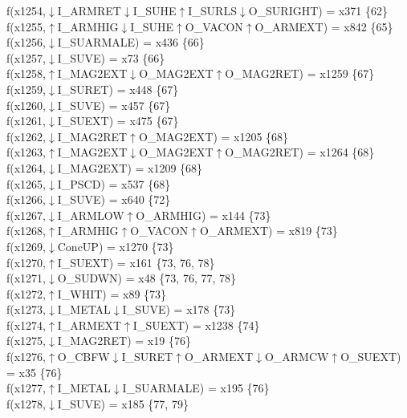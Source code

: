 f(x1254,$\downarrow$I\_ARMRET$\downarrow$I\_SUHE$\uparrow$I\_SURLS$\downarrow$O\_SURIGHT) = x371 \{62\} \\  
f(x1255,$\uparrow$I\_ARMHIG$\downarrow$I\_SUHE$\uparrow$O\_VACON$\uparrow$O\_ARMEXT) = x842 \{65\} \\  
f(x1256,$\downarrow$I\_SUARMALE) = x436 \{66\} \\  
f(x1257,$\downarrow$I\_SUVE) = x73 \{66\} \\  
f(x1258,$\uparrow$I\_MAG2EXT$\downarrow$O\_MAG2EXT$\uparrow$O\_MAG2RET) = x1259 \{67\} \\  
f(x1259,$\downarrow$I\_SURET) = x448 \{67\} \\  
f(x1260,$\downarrow$I\_SUVE) = x457 \{67\} \\  
f(x1261,$\downarrow$I\_SUEXT) = x475 \{67\} \\  
f(x1262,$\downarrow$I\_MAG2RET$\uparrow$O\_MAG2EXT) = x1205 \{68\} \\  
f(x1263,$\uparrow$I\_MAG2EXT$\downarrow$O\_MAG2EXT$\uparrow$O\_MAG2RET) = x1264 \{68\} \\  
f(x1264,$\downarrow$I\_MAG2EXT) = x1209 \{68\} \\  
f(x1265,$\downarrow$I\_PSCD) = x537 \{68\} \\  
f(x1266,$\downarrow$I\_SUVE) = x640 \{72\} \\  
f(x1267,$\downarrow$I\_ARMLOW$\uparrow$O\_ARMHIG) = x144 \{73\} \\  
f(x1268,$\uparrow$I\_ARMHIG$\uparrow$O\_VACON$\uparrow$O\_ARMEXT) = x819 \{73\} \\  
f(x1269,$\downarrow$ConcUP) = x1270 \{73\} \\  
f(x1270,$\uparrow$I\_SUEXT) = x161 \{73, 76, 78\} \\  
f(x1271,$\downarrow$O\_SUDWN) = x48 \{73, 76, 77, 78\} \\  
f(x1272,$\uparrow$I\_WHIT) = x89 \{73\} \\  
f(x1273,$\downarrow$I\_METAL$\downarrow$I\_SUVE) = x178 \{73\} \\  
f(x1274,$\uparrow$I\_ARMEXT$\uparrow$I\_SUEXT) = x1238 \{74\} \\  
f(x1275,$\downarrow$I\_MAG2RET) = x19 \{76\} \\  
f(x1276,$\uparrow$O\_CBFW$\downarrow$I\_SURET$\uparrow$O\_ARMEXT$\downarrow$O\_ARMCW$\uparrow$O\_SUEXT) = x35 \{76\} \\  
f(x1277,$\uparrow$I\_METAL$\downarrow$I\_SUARMALE) = x195 \{76\} \\  
f(x1278,$\downarrow$I\_SUVE) = x185 \{77, 79\} \\  
